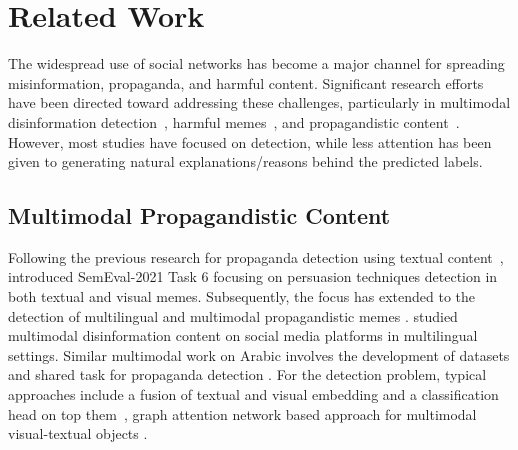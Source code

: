 \section{Related Work}
\label{sec:related_work}

The widespread use of social networks has become a major channel for spreading misinformation, propaganda, and harmful content. Significant research efforts have been directed toward addressing these challenges, particularly in multimodal disinformation detection~\cite{alam2022survey}, harmful memes~\cite{ijcai2022p781}, and propagandistic content~\cite{ACL2021:propaganda:memes}. However, most studies have focused on detection, while less attention has been given to generating natural explanations/reasons behind the predicted labels.

\subsection{Multimodal Propagandistic Content}
Following the previous research for propaganda detection using textual content~\cite{da-san-martino-etal-2019-fine}, \citet{dimitrov-etal-2021-semeval} introduced SemEval-2021 Task 6 focusing on persuasion techniques detection in both textual and visual memes. Subsequently, the focus has extended to the detection of multilingual and multimodal propagandistic memes \cite{dimitrov2024semeval}. \citet{Glenski2019MultilingualMD} studied multimodal disinformation content on social media platforms in multilingual settings. Similar multimodal work on Arabic involves the development of datasets and shared task for propaganda detection \cite{alam-etal-2024-armeme, araieval:arabicnlp2024-overview}. For the detection problem, typical approaches include a fusion of textual and visual embedding and a classification head on top them~\cite{araieval:arabicnlp2024-overview,shah-etal-2024-mememind}, graph attention network based approach for multimodal visual-textual objects \citet{chen2024multimodal}.



